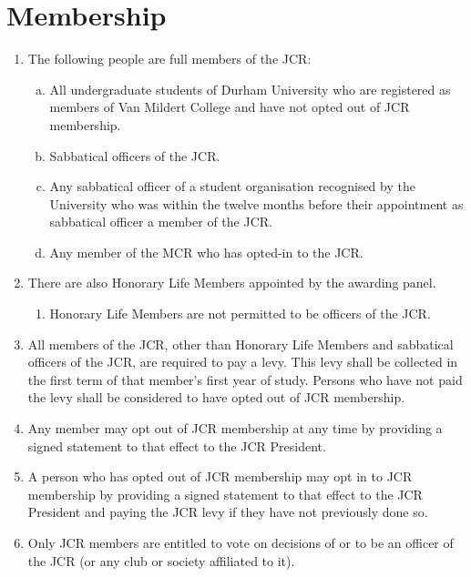 \documentclass[12pt]{article}  %
\begin{document}
\section{Membership}
\begin{enumerate}
    \item The following people are full members of the JCR:
    \begin{enumerate}[(a)]
        \item All undergraduate students of Durham University who are registered as members of Van Mildert College and have not opted out of JCR membership.
        \item Sabbatical officers of the JCR.
        \item Any sabbatical officer of a student organisation recognised by the University who was within the twelve months before their appointment as sabbatical officer a member of the JCR.
        \item Any member of the MCR who has opted-in to the JCR.
    \end{enumerate}
    \item There are also Honorary Life Members appointed by the awarding panel.
    \begin{enumerate}
        \item Honorary Life Members are not permitted to be officers of the JCR.
    \end{enumerate}
    \item All members of the JCR, other than Honorary Life Members and sabbatical officers of the JCR, are required to pay a levy. This levy shall be collected in the first term of that member’s first year of study. Persons who have not paid the levy shall be considered to have opted out of JCR membership.
    \item Any member may opt out of JCR membership at any time by providing a signed statement to that effect to the JCR President.
    \item A person who has opted out of JCR membership may opt in to JCR membership by providing a signed statement to that effect to the JCR President and paying the JCR levy if they have not previously done so.
    \item Only JCR members are entitled to vote on decisions of or to be an officer of the JCR (or any club or society affiliated to it).
\end{enumerate}
\newpage
\end{document}

